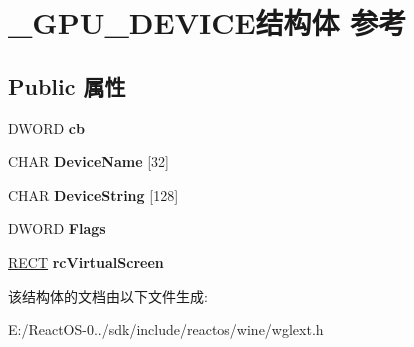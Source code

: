 \hypertarget{struct___g_p_u___d_e_v_i_c_e}{}\section{\+\_\+\+G\+P\+U\+\_\+\+D\+E\+V\+I\+C\+E结构体 参考}
\label{struct___g_p_u___d_e_v_i_c_e}
\subsection*{Public 属性}
\begin{DoxyCompactItemize}
\item 
\mbox{\label{struct___g_p_u___d_e_v_i_c_e_afcb22f16ba9e526610489ff56ab78ddb}} 
D\+W\+O\+RD {\bfseries cb}
\item 
\mbox{\label{struct___g_p_u___d_e_v_i_c_e_a604bfab61f1a2c5d1e635837d369ba14}} 
C\+H\+AR {\bfseries Device\+Name} \mbox{[}32\mbox{]}
\item 
\mbox{\label{struct___g_p_u___d_e_v_i_c_e_aff8b7920ccc85afcd6f325da6cdb0b73}} 
C\+H\+AR {\bfseries Device\+String} \mbox{[}128\mbox{]}
\item 
\mbox{\label{struct___g_p_u___d_e_v_i_c_e_a008db9d0f5fc13a5160805f40465f14a}} 
D\+W\+O\+RD {\bfseries Flags}
\item 
\mbox{\label{struct___g_p_u___d_e_v_i_c_e_aeb573bbeb3b6c589246720ef259b9a27}} 
\hyperlink{structtag_r_e_c_t}{R\+E\+CT} {\bfseries rc\+Virtual\+Screen}
\end{DoxyCompactItemize}


该结构体的文档由以下文件生成\+:\begin{DoxyCompactItemize}
\item 
E\+:/\+React\+O\+S-\/0../sdk/include/reactos/wine/wglext.\+h\end{DoxyCompactItemize}
